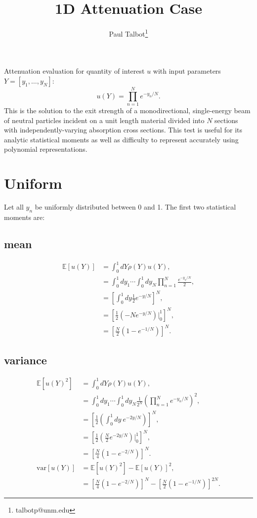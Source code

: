 \documentclass[11pt]{article}
\newcommand{\expv}[1]{\ensuremath{\mathbb{E}[ #1]}}
\begin{document}
\title{1D Attenuation Case}

\author{Paul Talbot\thanks{talbotp@unm.edu}}
\date{}
\maketitle

Attenuation evaluation for quantity of interest $u$ with input parameters $Y=[y_1,\ldots,y_N]$:
\begin{equation}
u(Y) = \prod_{n=1}^N e^{-y_n/N}.
\end{equation}
This is the solution to the exit strength of a monodirectional, single-energy beam of neutral particles incident on a unit length material divided into $N$ sections with independently-varying absorption cross sections.  This test is useful for its analytic statistical moments as well as difficulty to represent accurately using polynomial representations.

\section{Uniform}
Let all $y_n$ be uniformly distributed between 0 and 1.  The first two statistical moments are:
\subsection{mean}
\begin{align}
\expv{u(Y)} &=\int_{0}^1 dY \rho(Y)u(Y),\\
  &=\int_{0}^1 dy_1\cdots\int_{0}^1 dy_N \prod_{n=1}^N \frac{e^{-y_n/N}}{2},\\
  &=\left[ \int_{0}^1 dy \frac{1}{2}e^{-y/N}\right]^N,\\
  &=\left[\frac{1}{2}\left(-Ne^{-y/N}\right)\bigg|_0^1\right]^N,\\
  &=\left[\frac{N}{2}\left(1-e^{-1/N}\right)\right]^N.
\end{align}
\subsection{variance}
\begin{align}
\expv{u(Y)^2} &= \int_{0}^1 dY \rho(Y)u(Y),\\
  &=\int_{0}^1 dy_1\cdots\int_{0}^1 dy_N \frac{1}{2^N} \left(\prod_{n=1}^N e^{-y_n/N}\right)^2,\\
  &=\left[\frac{1}{2}\left(\int_{0}^1 dy\ e^{-2y/N} \right)\right]^N,\\
  &=\left[\frac{1}{2}\left(\frac{N}{2}e^{-2y/N} \right)\bigg|_{0}^1 \right]^N,\\
  &=\left[\frac{N}{4}\left(1-e^{-2/N}\right)\right]^N.\\
\text{var}[u(Y)] &= \expv{u(Y)^2}-\expv{u(Y)}^2,\\
  &= \left[\frac{N}{4}\left(1-e^{-2/N}\right)\right]^N - \left[\frac{N}{2}\left(1-e^{-1/N}\right)\right]^{2N}.
\end{align}
\end{document}
